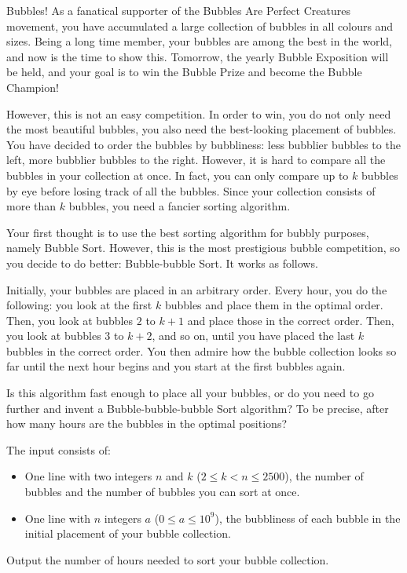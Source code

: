 

\newcommand{\maxn}{2500}
\newcommand{\maxa}{10^9}

Bubbles! As a fanatical supporter of the Bubbles Are Perfect Creatures movement, you have accumulated a large collection of bubbles in all colours and sizes. Being a long time member, your bubbles are among the best in the world, and now is the time to show this. Tomorrow, the yearly Bubble Exposition will be held, and your goal is to win the Bubble Prize and become the Bubble Champion!

However, this is not an easy competition. In order to win, you do not only need the most beautiful bubbles, you also need the best-looking placement of bubbles. You have decided to order the bubbles by bubbliness: less bubblier bubbles to the left, more bubblier bubbles to the right. However, it is hard to compare all the bubbles in your collection at once. In fact, you can only compare up to $k$ bubbles by eye before losing track of all the bubbles. Since your collection consists of more than $k$ bubbles, you need a fancier sorting algorithm.

Your first thought is to use the best sorting algorithm for bubbly purposes, namely Bubble Sort. However, this is the most prestigious bubble competition, so you decide to do better: Bubble-bubble Sort. It works as follows.

Initially, your bubbles are placed in an arbitrary order. Every hour, you do the following: you look at the first $k$ bubbles and place them in the optimal order. Then, you look at bubbles $2$ to $k+1$ and place those in the correct order. Then, you look at bubbles $3$ to $k+2$, and so on, until you have placed the last $k$ bubbles in the correct order. You then admire how the bubble collection looks so far until the next hour begins and you start at the first bubbles again.

Is this algorithm fast enough to place all your bubbles, or do you need to go further and invent a Bubble-bubble-bubble Sort algorithm? To be precise, after how many hours are the bubbles in the optimal positions?

\begin{Input}
    The input consists of:
    \begin{itemize}
        \item One line with two integers $n$ and $k$ ($2 \leq k < n \leq \maxn$),
        the number of bubbles and the number of bubbles you can sort at once.
        \item One line with $n$ integers $a$ ($0 \leq a \leq \maxa$),
        the bubbliness of each bubble in the initial placement of your bubble collection.
    \end{itemize}
\end{Input}

\begin{Output}
    Output the number of hours needed to sort your bubble collection.
\end{Output}
